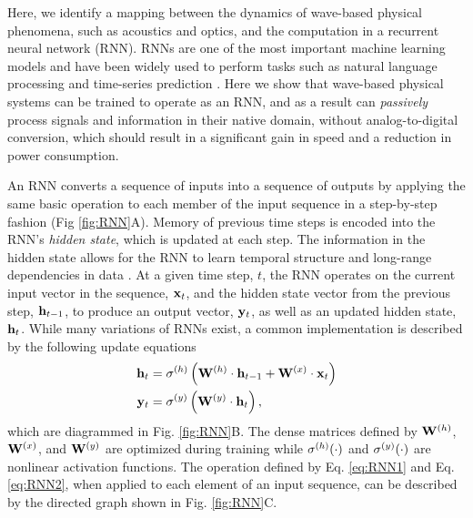 Here, we identify a mapping between the dynamics of wave-based physical phenomena, such as acoustics and optics, and the computation in a recurrent neural network (RNN).
RNNs are one of the most important machine learning models and have been widely used to perform tasks such as natural language processing \cite{yao2013recurrent} and time-series prediction \cite{husken_recurrent_2003, dorffner_neural_1996, connor_recurrent_1994}.
Here we show that wave-based physical systems can be trained to operate as an RNN, and as a result can \textit{passively} process signals and information in their native domain, without analog-to-digital conversion, which should result in a significant gain in speed and a reduction in power consumption.

An RNN converts a sequence of inputs into a sequence of outputs by applying the same basic operation to each member of the input sequence in a step-by-step fashion (Fig \ref{fig:RNN}A). 
Memory of previous time steps is encoded into the RNN's \textit{hidden state}, which is updated at each step.
The information in the hidden state allows for the RNN to learn temporal structure and long-range dependencies in data \cite{elman1990finding, jordan1997serial}.
At a given time step, $t$, the RNN operates on the current input vector in the sequence, $\mathbf{x}_t$, and the hidden state vector from the previous step, $\mathbf{h}_{t-1}$, to produce an output vector, $\mathbf{y}_t$, as well as an updated hidden state, $\mathbf{h}_t$. 
%
While many variations of RNNs exist, a common implementation \cite{Goodfellow-et-al-2016} is described by the following update equations
%
\begin{align}
    \mathbf{h}_t &= \sigma^{(h)} \left(\mathbf{W}^{(h)} \cdot \mathbf{h}_{t-1} + \mathbf{W}^{(x)} \cdot \mathbf{x}_t \right)
    \label{eq:RNN1} \\
    \mathbf{y}_t &= \sigma^{(y)} \left(\mathbf{W}^{(y)} \cdot \mathbf{h}_t\right),
    \label{eq:RNN2}
\end{align}
%
which are diagrammed in Fig. \ref{fig:RNN}B. 
The dense matrices defined by $\mathbf{W}^{(h)}$, $\mathbf{W}^{(x)}$, and $\mathbf{W}^{(y)}$ are optimized during training while $\sigma^{(h)}{\left(\cdot \right)}$ and $\sigma^{(y)}{\left(\cdot \right)}$ are nonlinear activation functions.
The operation defined by Eq. \ref{eq:RNN1} and Eq. \ref{eq:RNN2}, when applied to each element of an input sequence, can be described by the directed graph shown in Fig. \ref{fig:RNN}C.

